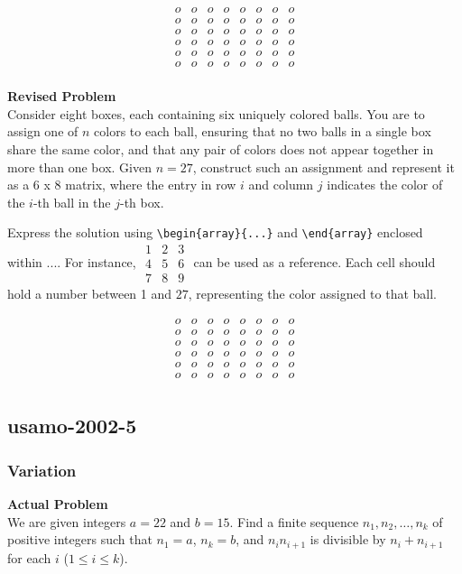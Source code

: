 $$\begin{array}{cccccccc}
o & o & o & o & o & o & o & o \\
o & o & o & o & o & o & o & o \\
o & o & o & o & o & o & o & o \\
o & o & o & o & o & o & o & o \\
o & o & o & o & o & o & o & o \\
o & o & o & o & o & o & o & o \\
\end{array}$$


\textbf{Revised Problem}\\
Consider eight boxes, each containing six uniquely colored balls. You are to assign one of $n$ colors to each ball, ensuring that no two balls in a single box share the same color, and that any pair of colors does not appear together in more than one box. Given $n=27$, construct such an assignment and represent it as a 6 x 8 matrix, where the entry in row $i$ and column $j$ indicates the color of the $i$-th ball in the $j$-th box.

Express the solution using \verb|\begin{array}{...}| and \verb|\end{array}| enclosed within $\boxed{...}$. For instance, $\boxed{\begin{array}{ccc}1 & 2 & 3 \\ 4 & 5 & 6 \\ 7 & 8 & 9\end{array}}$ can be used as a reference. Each cell should hold a number between 1 and $27$, representing the color assigned to that ball.

$$\begin{array}{cccccccc}
o & o & o & o & o & o & o & o \\
o & o & o & o & o & o & o & o \\
o & o & o & o & o & o & o & o \\
o & o & o & o & o & o & o & o \\
o & o & o & o & o & o & o & o \\
o & o & o & o & o & o & o & o \\
\end{array}$$

\subsection{usamo-2002-5}
\subsubsection{Variation}
\textbf{Actual Problem}\\
We are given integers $a = 22$ and $b = 15$. Find a finite sequence $n_1, n_2, \ldots, n_k$ of positive integers such that $n_1 = a$, $n_k = b$, and $n_in_{i+1}$ is divisible by $n_i + n_{i+1}$ for each $i$ ($1 \le i \le k$).

